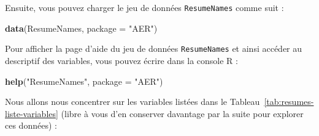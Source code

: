 \documentclass[
  11pt,
]{book}
\newenvironment{Shaded}{\begin{snugshade}}{\end{snugshade}}
\newcommand{\AttributeTok}[1]{\textcolor[rgb]{0.13,0.29,0.53}{#1}}
\newcommand{\FunctionTok}[1]{\textcolor[rgb]{0.13,0.29,0.53}{\textbf{#1}}}
\newcommand{\NormalTok}[1]{#1}
\newcommand{\StringTok}[1]{\textcolor[rgb]{0.31,0.60,0.02}{#1}}
\numberwithin{equation}{section}
\numberwithin{countremarque}{section}
\begin{document}
Ensuite, vous pouvez charger le jeu de données \texttt{ResumeNames} comme suit :

\begin{Shaded}
\begin{Highlighting}[]
\FunctionTok{data}\NormalTok{(ResumeNames, }\AttributeTok{package =} \StringTok{"AER"}\NormalTok{)}
\end{Highlighting}
\end{Shaded}

Pour afficher la page d'aide du jeu de données \texttt{ResumeNames} et ainsi accéder au descriptif des variables, vous pouvez écrire dans la console R :

\begin{Shaded}
\begin{Highlighting}[]
\FunctionTok{help}\NormalTok{(}\StringTok{"ResumeNames"}\NormalTok{, }\AttributeTok{package =} \StringTok{"AER"}\NormalTok{)}
\end{Highlighting}
\end{Shaded}

Nous allons nous concentrer sur les variables listées dans le Tableau~\ref{tab:resumes-liste-variables} (libre à vous d'en conserver davantage par la suite pour explorer ces données) :
\end{document}
